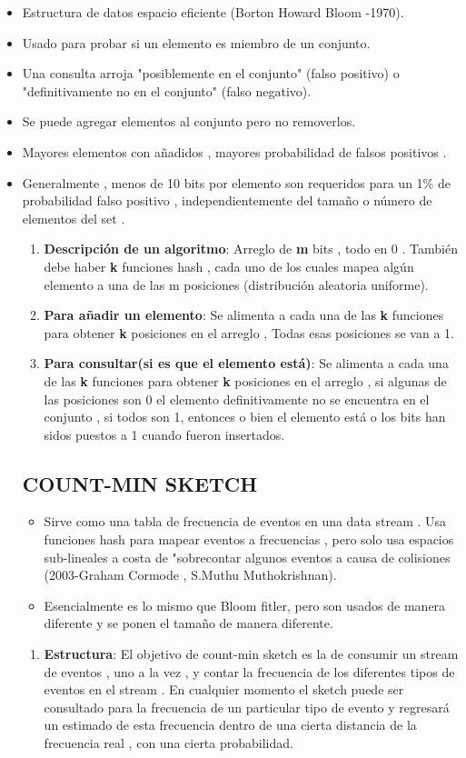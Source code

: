 \documentclass[journal]{IEEEtran}
\begin{document}
\begin{itemize}
    \item Estructura de datos espacio eficiente (Borton Howard Bloom -1970).
    \item Usado para probar si un elemento es miembro de un conjunto.
    \item Una consulta arroja "posiblemente en el conjunto" (falso positivo)  o "definitivamente no en el conjunto" (falso negativo).
    \item Se puede agregar elementos al conjunto pero no removerlos.
    \item Mayores elementos con añadidos , mayores probabilidad de falsos positivos .
    \item Generalmente , menos de 10 bits por elemento son requeridos para un 1\% de probabilidad falso positivo , independientemente del tamaño o número de elementos del set .
    \begin{enumerate}
    \item {\bf Descripción de un algoritmo}: Arreglo de \textbf{m} bits , todo en 0 . También debe haber \textbf{k} funciones hash , cada uno de los cuales mapea algún elemento a una de las m posiciones (distribución aleatoria uniforme). 
    \item {\bf Para añadir un elemento}: Se alimenta a cada una de las \textbf{k} funciones para obtener \textbf{k} posiciones en el arreglo , Todas esas posiciones se van a 1.
    \item {\bf Para consultar(si es que el elemento está)}: Se alimenta a cada una de las \textbf{k} funciones para obtener \textbf{k} posiciones en el arreglo , si algunas de las posiciones son 0 el elemento definitivamente no se encuentra en el conjunto , si todos son 1, entonces o bien el elemento está o los bits han sidos puestos a 1 cuando fueron insertados.
\end{enumerate}
\subsection{COUNT-MIN SKETCH}
\begin{itemize}
    \item Sirve como una tabla de frecuencia de eventos en una data stream . Usa funciones hash para mapear eventos a frecuencias , pero solo usa espacios sub-lineales a costa de "sobrecontar algunos eventos a causa de colisiones (2003-Graham Cormode , S.Muthu Muthokrishnan).
    \item Esencialmente es lo mismo que Bloom fitler, pero son usados de manera diferente y se ponen el tamaño de manera diferente.
\end{itemize}
\begin{enumerate}
    \item {\bf Estructura}: El objetivo de count-min sketch es la de consumir un stream de eventos , uno a la vez , y contar la frecuencia de los diferentes tipos de eventos en el stream . En cualquier momento el sketch puede ser consultado para la frecuencia de un particular tipo de evento y regresará un estimado de esta frecuencia dentro de una cierta distancia de la frecuencia real , con una cierta probabilidad.
\end{enumerate}

\end{itemize}
\end{document}
